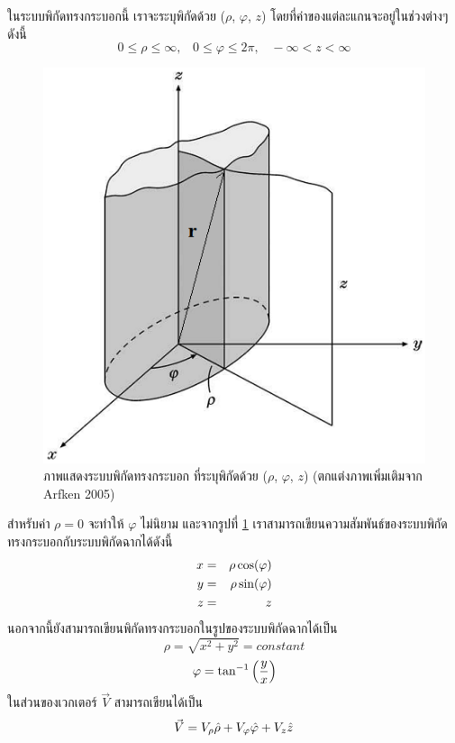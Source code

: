 ในระบบพิกัดทรงกระบอกนี้ เราจะระบุพิกัดด้วย ($\rho$, $\varphi$, $z$) โดยที่ค่าของแต่ละแกนจะอยู่ในช่วงต่างๆดังนี้
\begin{equation}\label{CylinderCoorRange}
0 \leq \rho \leq \infty, \;\;\; 0 \leq \varphi \leq 2\pi, \;\;\; - \infty < z < \infty
\end{equation}

\begin{figure}%
\centering
\includegraphics[width=0.75\columnwidth]{CylinderCoor.png}
\caption{ภาพแสดงระบบพิกัดทรงกระบอก ที่ระบุพิกัดด้วย ($\rho$, $\varphi$, $z$) (ตกแต่งภาพเพิ่มเติมจาก Arfken 2005)}
\label{fig6}
\end{figure}
สำหรับค่า $\rho = 0$ จะทำให้ $\varphi$ ไม่นิยาม และจากรูปที่ \ref{fig6} เราสามารถเขียนความสัมพันธ์ของระบบพิกัดทรงกระบอกกับระบบพิกัดฉากได้ดังนี้
\begin{eqnarray}\label{CylinderInCatesian}
x &=& \rho \cos (\varphi) \nonumber \\
y &=& \rho \sin (\varphi) \\
z &=& z \nonumber
\end{eqnarray}
นอกจากนี้ยังสามารถเขียนพิกัดทรงกระบอกในรูปของระบบพิกัดฉากได้เป็น
\begin{equation}\label{RhoInXY}
\rho = \sqrt{x^2 + y^2} = constant
\end{equation}
\begin{equation}\label{VarphiInXY}
\varphi = \tan^{-1}\left(\frac{y}{x}\right)
\end{equation}
ในส่วนของเวกเตอร์ $\vec{V}$ สามารถเขียนได้เป็น
\begin{equation}\label{CylinderVecV}
\vec{V} = V_\rho\hat{\rho} + V_\varphi\hat{\varphi} + V_z\hat{z}
\end{equation}
